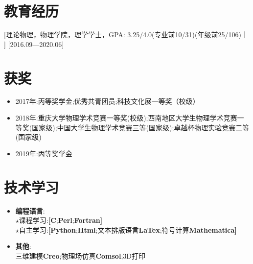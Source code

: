 \documentclass{resume}
\begin{document}


\ResumeTitle


\section{教育经历}

[\textnormal{理论物理，物理学院，理学学士，GPA: 3.25/4.0\small{(专业前10/31)(年级前25/106)}}｜ ]   [2016.09—2020.06]

\section{获奖}
\begin{itemize}
  \item 2017年:丙等奖学金;优秀共青团员;科技文化展一等奖（校级）
  \item 2018年:重庆大学物理学术竞赛一等奖(校级);西南地区大学生物理学术竞赛一等奖(国家级);中国大学生物理学术竞赛三等(国家级);卓越杯物理实验竞赛二等(国家级)
  \item 2019年:丙等奖学金
\end{itemize}

\section{技术学习}
\begin{itemize}
  \item \textbf{编程语言}:
  \\ $\star$课程学习:\textbf{[}\textbf{C};\textbf{Perl};\textbf{Fortran}\textbf{]}
  \\ $\star$自主学习:\textbf{[}\textbf{Python};\textbf{Html};文本排版语言\textbf{LaTex};符号计算\textbf{Mathematica}\textbf{]}
  \item \textbf{其他}: 
  \\ 三维建模\textbf{Creo};物理场仿真\textbf{Comsol};3D打印
\end{itemize}
\end{document}
